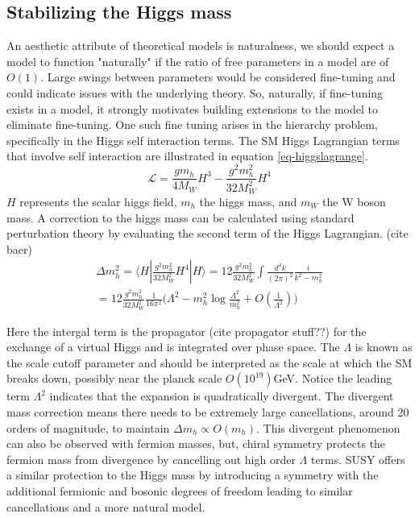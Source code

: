 \subsection{Stabilizing the Higgs mass}

An aesthetic attribute of theoretical models is naturalness, we should expect a model to function "naturally" if the ratio of free parameters in a model are of $O(1)$. Large swings between parameters would be considered fine-tuning and could indicate issues with the underlying theory. So, naturally, if fine-tuning exists in a model, it strongly motivates building extensions to the model to eliminate fine-tuning. %
One such fine tuning arises in the hierarchy problem, specifically in the Higgs self interaction terms. The SM Higgs Lagrangian terms that involve self interaction are illustrated in equation \ref{eq-higgslagrange}.
\begin{equation}
\label{eq-higgslagrange}
\mathcal{L}=\frac{gm_h}{4M_W}H^3 - \frac{g^2m_h^2}{32M_W^2}H^4
\end{equation}
$H$ represents the scalar higgs field, $m_h$ the higgs mass, and $m_W$ the W boson  mass. A correction to the higgs mass can be calculated using standard perturbation theory by evaluating the second term of the Higgs Lagrangian. (cite baer)
\begin{equation}
\begin{split}
\Delta m_h^2 = \langle H | \frac{g^2m_h^2}{32M_W^2} H^4 | H  \rangle = 12\frac{g^2m_h^2}{32M_W^2}\int \frac{d^4 k}{(2\pi)^2} \frac{i}{k^2 - m_h^2}\\
= 12\frac{g^2m_h^2}{32M_W^2} \frac{1}{16\pi^2}\big( \Lambda^2 - m_h^2\log\frac{\Lambda^2}{m_h^2} + O(\frac{1}{\Lambda^2})\big)
\end{split} 
\end{equation}
 
 Here the intergal term is the propagator (cite propagator stuff??) for the exchange of a virtual Higgs and is integrated over phase space. The $\Lambda$ is known as the scale cutoff parameter and should be interpreted as the scale at which the SM breaks down, possibly near the planck scale $O(10^{19})$GeV. Notice the leading term $\Lambda^2$ indicates that the expansion is quadratically divergent. The divergent mass correction means there needs to be extremely large cancellations, around 20 orders of magnitude, to maintain $\Delta m_h \propto O(m_h)$. This divergent phenomenon can also be observed with fermion masses, but, chiral symmetry protects the fermion mass from divergence by cancelling out high order $\Lambda$ terms. SUSY offers a similar protection to the Higgs mass by introducing a symmetry with the additional fermionic and bosonic degrees of freedom leading to similar cancellations and a more natural model. 


